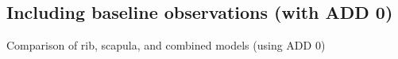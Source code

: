 \documentclass{beamer}
\begin{document}




\subsection{Including baseline observations (with ADD 0)}

\begin{frame}{Comparison of rib, scapula, and combined models (using ADD 0)}

  
  \vspace{0.2in}



\end{frame}
\end{document}
